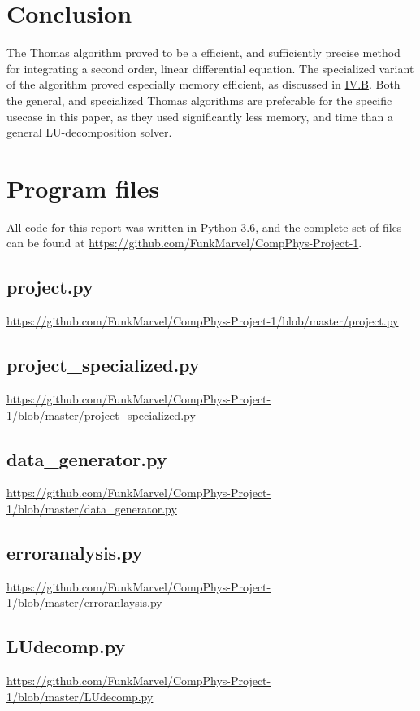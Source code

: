 \documentclass[english,notitlepage,reprint]{revtex4-1}  %
\begin{document}
\section{Conclusion}\label{sec:5}
The Thomas algorithm proved to be a efficient, and sufficiently precise method for integrating a second order, linear differential equation. The specialized variant of the algorithm proved especially memory efficient, as discussed in \hyperref[subsec:44]{IV.B}.
Both the general, and specialized Thomas algorithms are preferable for the specific usecase in this paper, as they used significantly less memory, and time than a general LU-decomposition solver.


\newpage
\appendix
\section{Program files} \label{A}
All code for this report was written in Python 3.6, and the complete set of files can be found at \url{https://github.com/FunkMarvel/CompPhys-Project-1}.
\subsection{project.py}\label{A:1}
\url{https://github.com/FunkMarvel/CompPhys-Project-1/blob/master/project.py}

\subsection{project\_specialized.py}\label{A:2}
\url{https://github.com/FunkMarvel/CompPhys-Project-1/blob/master/project_specialized.py}

\subsection{data\_generator.py} \label{A:3}
\url{https://github.com/FunkMarvel/CompPhys-Project-1/blob/master/data_generator.py}

\subsection{erroranalysis.py} \label{A:4}
\url{https://github.com/FunkMarvel/CompPhys-Project-1/blob/master/erroranlaysis.py}

\subsection{LUdecomp.py}\label{A:5}
\url{https://github.com/FunkMarvel/CompPhys-Project-1/blob/master/LUdecomp.py}

{}
\end{document}
